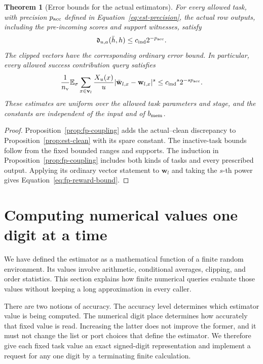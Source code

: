 \documentclass[11pt]{article}
\numberwithin{equation}{section}
\newtheorem{theorem}{Theorem}[section]
\theoremstyle{definition}
\theoremstyle{remark}
\begin{document}
\begin{theorem}[Error bounds for the actual estimators]
\label{thm:fp-estimators}
For every allowed task, with precision ${p_{\rm acc}}$ defined in
Equation~\eqref{eq:est-precision}, the actual row outputs, including the
pre-incoming scores and support witnesses, satisfy
\[
                \mathfrak d_{u,a}(\bar {h},{h})\le {c_{\rm ind}}2^{-{p_{\rm acc}}}.
\]
The clipped vectors have the corresponding ordinary error bound.
In particular, every allowed success contribution query satisfies
\begin{equation}
 \frac1{n_{\rm v}}\mathbb E_\sigma\sum_{x\in {\mathbf{v}}_l}\frac{X_u(x)}u
           |\bar {\mathbf{w}}_{l,x}-{\mathbf{w}}_{l,x}|^s\le {c_{\rm ind}}^s2^{-s{p_{\rm acc}}}.
 \label{eq:fp-reward-bound}
\end{equation}
These estimates are uniform over the allowed task parameters and stage,
and the constants are independent of the input and of ${b_{\rm mem}}$.
\end{theorem}

\begin{proof}
Proposition~\ref{prop:fp-coupling} adds the actual--clean discrepancy
to Proposition~\ref{prop:est-clean} with its spare constant.  The
inactive-task bounds follow from the fixed bounded ranges and supports.
The induction in Proposition~\ref{prop:fp-coupling} includes both kinds
of tasks and every prescribed output.  Applying its ordinary vector
statement to ${\mathbf{w}}_l$ and taking the $s$-th power gives
Equation~\eqref{eq:fp-reward-bound}.
\end{proof}





\section{Computing numerical values one digit at a time}
\label{sec:arith}

We have defined the estimator as a mathematical function of a finite random environment. Its values involve arithmetic, conditional averages, clipping, and order statistics. This section explains how finite numerical queries evaluate those values without keeping a long approximation in every caller.

There are two notions of accuracy. The accuracy level determines which estimator value is being computed. The numerical digit place determines how accurately that fixed value is read. Increasing the latter does not improve the former, and it must not change the list or port choices that define the estimator. We therefore give each fixed task value an exact signed-digit representation and implement a request for any one digit by a terminating finite calculation.
\end{document}

